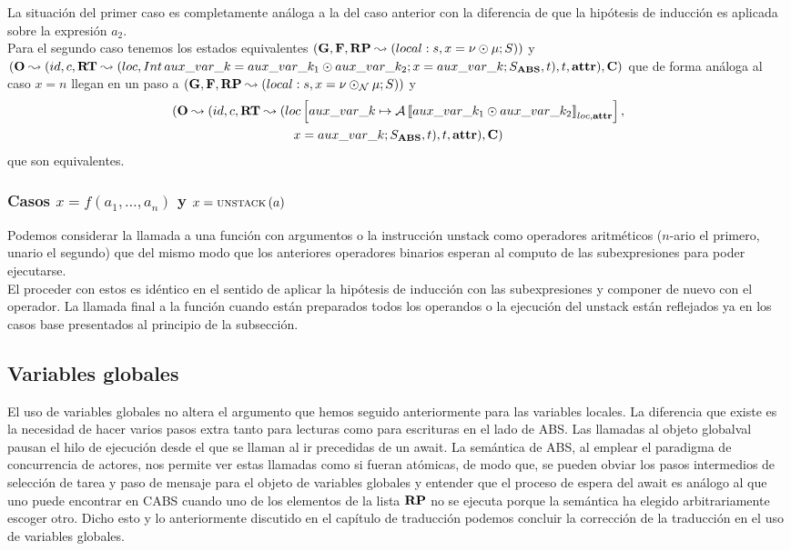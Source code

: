 La situación del primer caso es completamente análoga a la del caso anterior con la diferencia de que la hipótesis de inducción es aplicada sobre la expresión $a_2$.\\

Para el segundo caso tenemos los estados equivalentes $(\mathbf{G}, \mathbf{F}, \textbf{RP} \leadsto (local:s,x = \nu \odot \mu\mbox{;\,}S))$ y $(\mathbf{O} \leadsto (id, c, \textbf{RT} \leadsto (loc, Int\,aux\_var\_k =  aux\_var\_k_1 \odot  aux\_var\_k_2\mbox{;\,} x = aux\_var\_k\mbox{;\,} S_{\textbf{ABS}}, t), t, \textbf{attr}), \mathbf{C})$ que de forma análoga al caso $x = n$ llegan en un paso a $(\mathbf{G}, \mathbf{F}, \textbf{RP} \leadsto (local:s,x = \nu \odot_{\mathcal{N}} \mu\mbox{;\,}S))$ y
\begin{multline*}
  (\mathbf{O} \leadsto (id, c, \textbf{RT} \leadsto (loc \left[ aux\_var\_k\mapsto\mathcal{A} \left\llbracket aux\_var\_k_1 \odot  aux\_var\_k_2 \right\rrbracket_{loc, \textbf{attr}} \right],\\
  x = aux\_var\_k\mbox{;\,}S_{\textbf{ABS}}, t), t, \textbf{attr}), \mathbf{C})
\end{multline*}
que son equivalentes.

\subsubsection{Casos $x = f(a_1, \dots, a_n)$ y $x = \text{\scriptsize{UNSTACK}}\left(a\right)$}
Podemos considerar la llamada a una función con argumentos o la instrucción unstack como operadores aritméticos ($n$-ario el primero, unario el segundo) que del mismo modo que los anteriores operadores binarios esperan al computo de las subexpresiones para poder ejecutarse.\\

El proceder con estos es idéntico en el sentido de aplicar la hipótesis de inducción con las subexpresiones y componer de nuevo con el operador. La llamada final a la función cuando están preparados todos los operandos o la ejecución del unstack están reflejados ya en los casos base presentados al principio de la subsección.

\subsection{Variables globales}

El uso de variables globales no altera el argumento que hemos seguido anteriormente para las variables locales. La diferencia que existe es la necesidad de hacer varios pasos extra tanto para lecturas como para escrituras en el lado de ABS. Las llamadas al objeto globalval pausan el hilo de ejecución desde el que se llaman al ir precedidas de un await. La semántica de ABS, al emplear el paradigma de concurrencia de actores, nos permite ver estas llamadas como si fueran atómicas, de modo que, se pueden obviar los pasos intermedios de selección de tarea y paso de mensaje para el objeto de variables globales y entender que el proceso de espera del await es análogo al que uno puede encontrar en CABS cuando uno de los elementos de la lista $\textbf{RP}$ no se ejecuta porque la semántica ha elegido arbitrariamente escoger otro. Dicho esto y lo anteriormente discutido en el capítulo de traducción podemos concluir la corrección de la traducción en el uso de variables globales.

